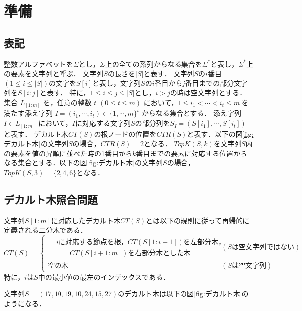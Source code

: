 \chapter{準備}
\section{表記}
整数アルファベットを$\Sigma$とし，$\Sigma$上の全ての系列からなる集合を$\Sigma^\ast$と表し，$\Sigma^\ast$上の要素を文字列と呼ぶ．
文字列$S$の長さを$|S|$と表す．
文字列$S$の$i$番目$(1 \leq i \leq |S|)$の文字を$S[i]$と表し，文字列$S$の$i$番目から$j$番目までの部分文字列を$S[i:j]$と表す．
特に，$1\leq i \leq j \leq |S|$とし，$i > j$の時は空文字列とする．
集合 $L_{[1:m]}$ を，任意の整数 $t$ $(0 \leq t \leq m)$ において，$1 \leq i_1 < \cdots < i_t \leq m$ を満たす添え字列 $I = (i_1, \cdots, i_t) \in \{1, \cdots, m\}^t$ からなる集合とする．
添え字列 $I \in L_{[1:m]}$ において，$I$に対応する文字列$S$の部分列を$S_I = (S[i_1], \cdots, S[i_t])$ と表す．
デカルト木$CT(S)$の根ノードの位置を$CTR(S)$と表す．以下の図\ref{fig:デカルト木}の文字列$S$の場合，$CTR(S)=2$となる．
$TopK(S,k)$を文字列$S$内の要素を値の昇順に並べた時の1番目から$k$番目までの要素に対応する位置からなる集合とする．以下の図\ref{fig:デカルト木}の文字列$S$の場合，$TopK(S,3)=\{2,4,6\}$となる．
\section{デカルト木照合問題}
\begin{definition}
  文字列$S[1:m]$に対応したデカルト木$CT(S)$とは以下の規則に従って再帰的に定義される二分木である．
    \begin{displaymath}
      CT(S)=
      \begin{cases}
        \begin{aligned}
          &i \textit{に対応する節点を根，} CT(S[1:i-1]) \text{を左部分木，}\\
          & \qquad CT(S[i+1:m]) \text{を右部分木とした木}
        \end{aligned}&(S \text{は空文字列ではない})\\
        \text{空の木} & (S \text{は空文字列})
      \end{cases}
    \end{displaymath}
    特に，$i$は$S$中の最小値の最左のインデックスである．
\end{definition}

\begin{example}
  文字列$S=(17,10,19,10,24,15,27)$のデカルト木は以下の図\ref{fig:デカルト木}のようになる．
\end{example}

